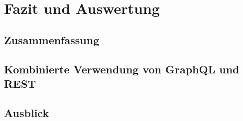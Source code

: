 \chapter{Fazit und Auswertung}

\section{Zusammenfassung}

\section{Kombinierte Verwendung von GraphQL und REST}

\section{Ausblick}

